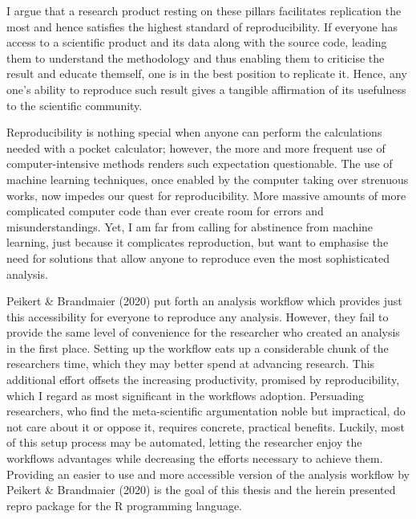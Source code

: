 \documentclass[]{book}
\begin{document}
I argue that a research product resting on these pillars facilitates replication the most and hence satisfies the highest standard of reproducibility.
If everyone has access to a scientific product and its data along with the source code, leading them to understand the methodology and thus enabling them to criticise the result and educate themself, one is in the best position to replicate it.
Hence, any one's ability to reproduce such result gives a tangible affirmation of its usefulness to the scientific community.

Reproducibility is nothing special when anyone can perform the calculations needed with a pocket calculator; however, the more and more frequent use of computer-intensive methods renders such expectation questionable.
The use of machine learning techniques, once enabled by the computer taking over strenuous works, now impedes our quest for reproducibility.
More massive amounts of more complicated computer code than ever create room for errors and misunderstandings.
Yet, I am far from calling for abstinence from machine learning, just because it complicates reproduction, but want to emphasise the need for solutions that allow anyone to reproduce even the most sophisticated analysis.

Peikert \& Brandmaier (2020) put forth an analysis workflow which provides just this accessibility for everyone to reproduce any analysis.
However, they fail to provide the same level of convenience for the researcher who created an analysis in the first place.
Setting up the workflow eats up a considerable chunk of the researchers time, which they may better spend at advancing research. This additional effort offsets the increasing productivity, promised by reproducibility, which I regard as most significant in the workflows adoption.
Persuading researchers, who find the meta-scientific argumentation noble but impractical, do not care about it or oppose it, requires concrete, practical benefits.
Luckily, most of this setup process may be automated, letting the researcher enjoy the workflows advantages while decreasing the efforts necessary to achieve them.
Providing an easier to use and more accessible version of the analysis workflow by Peikert \& Brandmaier (2020) is the goal of this thesis and the herein presented repro package for the R programming language.
\end{document}
